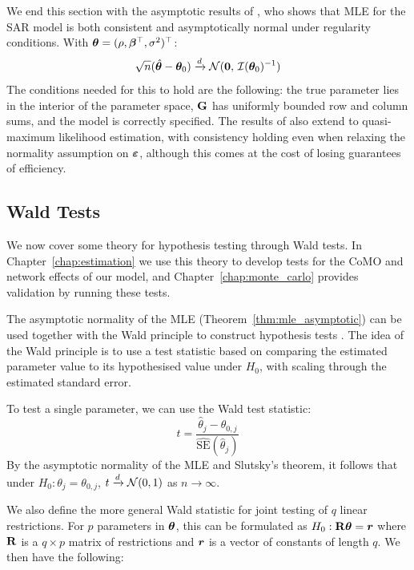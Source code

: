 We end this section with the asymptotic results of \textcite[Thm.~3.2, p.~1906; Assumptions 1--8, pp.~1902--1904]{Lee2004}, who shows that MLE for the SAR model is both consistent and asymptotically normal under regularity conditions. With $\bm{\theta} = (\rho, \bm{\beta}^\top, \sigma^2)^\top$:
\begin{equation}
    \sqrt{n}(\hat{\bm{\theta}} - \bm{\theta}_0) \xrightarrow{d} \mathcal{N}(\bm{0},\, \mathcal{I}(\bm{\theta}_0)^{-1})
\end{equation}
The conditions needed for this to hold are the following: the true parameter lies in the interior of the parameter space, $\mathbf{G}$ has uniformly bounded row and column sums, and the model is correctly specified. The results of \textcite[Thm.~3.2 and Sec.~4]{Lee2004} also extend to quasi-maximum likelihood estimation, with consistency holding even when relaxing the normality assumption on $\bm{\varepsilon}$, although this comes at the cost of losing guarantees of efficiency.

\subsection{Wald Tests}
\label{sec:bg:asymptotic}
We now cover some theory for hypothesis testing through Wald tests. In Chapter~\ref{chap:estimation} we use this theory to develop tests for the CoMO and network effects of our model, and Chapter~\ref{chap:monte_carlo} provides validation by running these tests.

The asymptotic normality of the MLE (Theorem~\ref{thm:mle_asymptotic}) can be used together with the Wald principle to construct hypothesis tests \parencite[Sec.~10.3.2, p.~493]{Casella2002}. The idea of the Wald principle is to use a test statistic based on comparing the estimated parameter value to its hypothesised value under $H_0$, with scaling through the estimated standard error.

To test a single parameter, we can use the Wald test statistic:
\begin{equation}
    t = \frac{\hat{\theta}_j - \theta_{0,j}}{\widehat{\text{SE}}(\hat{\theta}_j)}
\end{equation}
By the asymptotic normality of the MLE and Slutsky's theorem, it follows that under $H_0: \theta_j = \theta_{0,j}$, $t \xrightarrow{d} \mathcal{N}(0, 1)$ as $n \to \infty$.

We also define the more general Wald statistic for joint testing of $q$ linear restrictions. For $p$ parameters in $\bm{\theta}$, this can be formulated as $H_0: \mathbf{R}\bm{\theta} = \bm{r}$ where $\mathbf{R}$ is a $q \times p$ matrix of restrictions and $\bm{r}$ is a vector of constants of length $q$. We then have the following:

